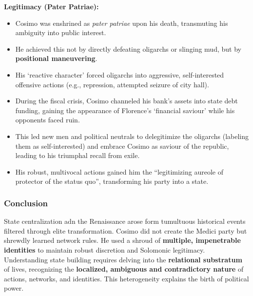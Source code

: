 \documentclass{article}
\begin{document}
    \noindent \textbf{Legitimacy (Pater Patriae):}
    \begin{itemize}
        \item Cosimo was enshrined as \textit{pater patriae} upon his death,
        transmuting his ambiguity into public interest.
        \item He achieved this not by directly defeating oligarchs or
        slinging mud, but by \textbf{positional maneuvering}.
        \item His `reactive character' forced oligarchs into aggressive,
        self-interested offensive actions (e.g., repression, attempted
        seizure of city hall).
        \item During the fiscal crisis, Cosimo channeled his bank's assets
        into state debt funding, gaining the appearance of Florence's
        `financial saviour' while his opponents faced ruin.
        \item This led new men and political neutrals to delegitimize the
        oligarchs (labeling them as self-interested) and embrace Cosimo as
        saviour of the republic, leading to his triumphal recall from exile.
        \item His robust, multivocal actions gained him the ``legitimizing
        aureole of protector of the status quo'', transforming his party
        into a state.
    \end{itemize}

    \subsubsection{Conclusion}

    \noindent State centralization adn the Renaissance arose form tumultuous
historical events filtered through elite transformation. Cosimo did not
create the Medici party but shrewdly learned network rules. He used a shroud
of \textbf{multiple, impenetrable identities} to maintain robust discretion
and Solomonic legitimacy.\\

    \noindent Understanding state building requires delving into the
\textbf{relational substratum} of lives, recognizing the
\textbf{localized, ambiguous and contradictory nature} of actions, networks,
and identities. This heterogeneity explains the birth of political power.
\end{document}
